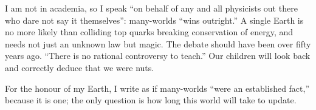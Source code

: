 I am not in academia, so I speak ``on behalf of any and all physicists out there who dare not say it themselves'': many-worlds ``wins outright.'' A single Earth is no more likely than colliding top quarks breaking conservation of energy, and needs not just an unknown law but magic. The debate should have been over fifty years ago. ``There is no rational controversy to teach.'' Our children will look back and correctly deduce that we were nuts. 

For the honour of my Earth, I write as if many-worlds ``were an established fact,'' because it is one; the only question is how long this world will take to update.
